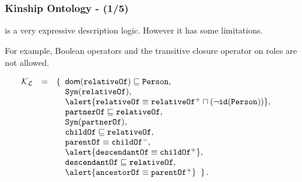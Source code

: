 \documentclass[8pt]{beamer}
\newcommand{\Persons}{\mathtt{Person}}
\newcommand{\relative}{\mathtt{relativeOf}}
\newcommand{\partner}{\mathtt{partnerOf}}
\newcommand{\child}{\mathtt{childOf}}
\newcommand{\parent}{\mathtt{parentOf}}
\newcommand{\ancestor}{\mathtt{ancestorOf}}
\newcommand{\descendant}{\mathtt{descendantOf}}
\newcommand{\KBsets}{\mathcal{K}_{\mathcal{L}}}
\begin{document}
\section{\sroiq}

\begin{frame}
\frametitle{Kinship Ontology - \sroiq (1/5)}

  \sroiq is a very expressive description logic. However it has some
  limitations.
  
  For example, Boolean operators and the transitive closure operator on roles are not allowed.
  \vspace{\baselineskip}
  
  \begin{small}
  \[  
   \begin{array}{rcl}
    \KBsets & = & \{\;\; \dom(\relative) \Issub \Persons,\\
    &&\phantom{\{\;\;} \issymmetric{\relative},\\
    &&\phantom{\{\;\;} \alert{\relative \equiv \relative^{+} \sqcap (\neg 
    \roleidentity{\Persons})},~~~~~~~ \\
    &&\phantom{\{\;\;} \partner \Issub \relative,\\
    &&\phantom{\{\;\;} \issymmetric{\partner},\\
    &&\phantom{\{\;\;} \child \Issub \relative,\\
    &&\phantom{\{\;\;} \parent \equiv \child^{-},\\
    &&\phantom{\{\;\;} \alert{\descendant \equiv \child^{+}},\\
    &&\phantom{\{\;\;} \descendant \Issub \relative,\\
    &&\phantom{\{\;\;} \alert{\ancestor \equiv \parent^{+}}\;\;\}\,.
    \end{array}
  \]
  \end{small}
\end{frame}
\end{document}

